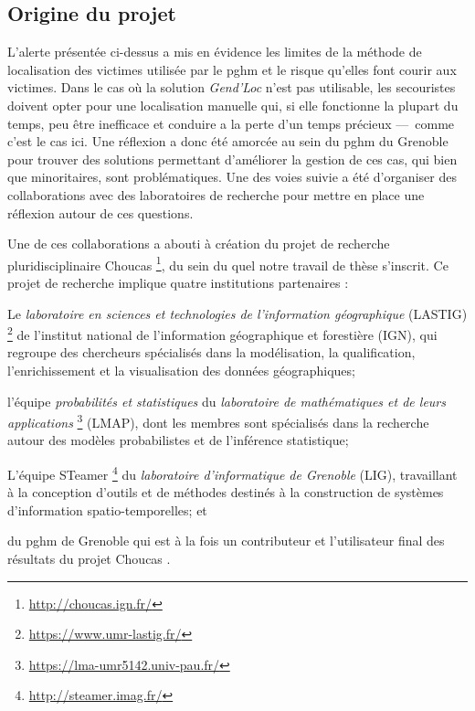 \subsection{Origine du projet}
\label{subsec:1-2-1}

L’alerte présentée ci-dessus a mis en évidence les limites de la
méthode de localisation des victimes utilisée par le \ac{pghm} et le
risque qu'elles font courir aux victimes. Dans le cas où la solution
\emph{Gend'Loc} n'est pas utilisable, les secouristes doivent opter
pour une localisation manuelle qui, si elle fonctionne la plupart du
temps, peu être inefficace et conduire a la perte d'un temps précieux
---~comme c'est le cas ici. Une réflexion a donc été amorcée au sein
du \ac{pghm} du Grenoble pour trouver des solutions permettant
d'améliorer la gestion de ces cas, qui bien que minoritaires, sont
problématiques. Une des voies suivie a été d'organiser des
collaborations avec des laboratoires de recherche pour mettre en place
une réflexion autour de ces questions.

Une de ces collaborations a abouti à création du projet de recherche
pluridisciplinaire Choucas \footnote{\url{http://choucas.ign.fr/}}, du
sein du quel notre travail de thèse s'inscrit. Ce projet de recherche
implique quatre institutions partenaires :
%
\begin{enumerate*}[label=(\arabic*)]
\item Le \emph{laboratoire en sciences et technologies de
    l'information géographique} (LASTIG)
  \footnote{\url{https://www.umr-lastig.fr/}} de l'institut national
  de l'information géographique et forestière (IGN), qui regroupe des
  chercheurs spécialisés dans la modélisation, la qualification,
  l'enrichissement et la visualisation des données géographiques;
\item l'équipe \emph{probabilités et statistiques} du
  \emph{laboratoire de mathématiques et de leurs applications}
  \footnote{\url{https://lma-umr5142.univ-pau.fr/}} (LMAP), dont les
  membres sont spécialisés dans la recherche autour des modèles
  probabilistes et de l'inférence statistique;
\item L'équipe STeamer \footnote{\url{http://steamer.imag.fr/}} du
  \emph{laboratoire d'informatique de Grenoble} (LIG), travaillant à
  la conception d'outils et de méthodes destinés à la construction de
  systèmes d'information spatio-temporelles; et
\item du \ac{pghm} de Grenoble qui est à la fois un contributeur et
  l'utilisateur final des résultats du projet Choucas
  \autocite{Choucas2020}.
\end{enumerate*}

